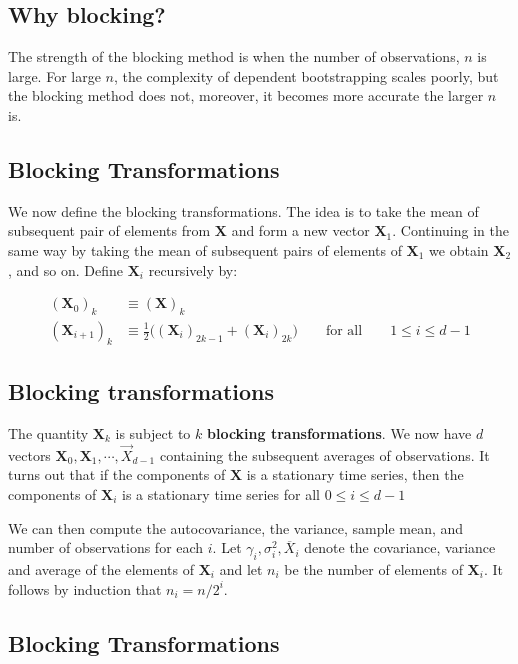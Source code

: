 \documentclass[%
oneside,                 %
final,                   %
10pt]{article}
\begin{document}
\subsection{Why blocking?}

The strength of the blocking method is when the number of
observations, $n$ is large. For large $n$, the complexity of dependent
bootstrapping scales poorly, but the blocking method does not,
moreover, it becomes more accurate the larger $n$ is.

\subsection{Blocking Transformations}
 We now define the blocking transformations. The idea is to take the mean of subsequent
pair of elements from $\bm{X}$ and form a new vector
$\bm{X}_1$. Continuing in the same way by taking the mean of
subsequent pairs of elements of $\bm{X}_1$ we obtain $\bm{X}_2$, and
so on. 
Define $\bm{X}_i$ recursively by:

\begin{align} 
(\bm{X}_0)_k &\equiv (\bm{X})_k \nonumber \\
(\bm{X}_{i+1})_k &\equiv \frac{1}{2}\Big( (\bm{X}_i)_{2k-1} +
(\bm{X}_i)_{2k} \Big) \qquad \text{for all} \qquad 1 \leq i \leq d-1
\end{align} 

\subsection{Blocking transformations}

The quantity $\bm{X}_k$ is
subject to $k$ \textbf{blocking transformations}.  We now have $d$ vectors
$\bm{X}_0, \bm{X}_1,\cdots,\vec X_{d-1}$ containing the subsequent
averages of observations. It turns out that if the components of
$\bm{X}$ is a stationary time series, then the components of
$\bm{X}_i$ is a stationary time series for all $0 \leq i \leq d-1$

We can then compute the autocovariance, the variance, sample mean, and
number of observations for each $i$. 
Let $\gamma_i, \sigma_i^2,
\overline{X}_i$ denote the covariance, variance and average of the
elements of $\bm{X}_i$ and let $n_i$ be the number of elements of
$\bm{X}_i$. It follows by induction that $n_i = n/2^i$. 

\subsection{Blocking Transformations}
\end{document}
